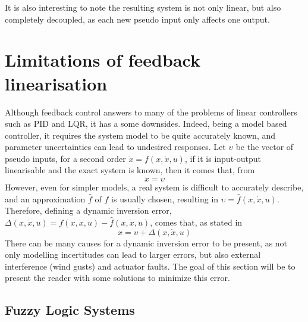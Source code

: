 It is also interesting to note the resulting system is not only linear, but also completely decoupled, as each new pseudo input only affects one output.

\section{Limitations of feedback linearisation}
\label{section:background/limitations}
Although feedback control answers to many of the problems of linear controllers such as PID and LQR, it has a some downsides. Indeed, being a model based controller, it requires the system model to be quite accurately known, and parameter uncertainties can lead to undesired responses. Let $\upsilon$ be the vector of pseudo inputs, for a second order $\ddot{x} = f(x,\dot{x},u)$, if it is input-output linearisable and the exact system is known, then it comes that, from \cite{YANG+LIN_Adaptive_Flight_Control}
\begin{equation}
\ddot{x}=\upsilon
\end{equation}
However, even for simpler models, a real system is difficult to accurately describe, and an approximation $\hat{f}$ of $f$ is usually chosen, resulting in $\upsilon=\hat{f}(x,\dot{x},u)$. Therefore, defining a dynamic inversion error, $\Delta(x,\dot{x},u)=f(x,\dot{x},u)-\hat{f}(x,\dot{x},u)$, comes that, as stated in \cite{YANG+LIN_Adaptive_Flight_Control}
\begin{equation}
\ddot{x}=\upsilon + \Delta(x,\dot{x},u)
\label{eq:system+error}
\end{equation}
There can be many causes for a dynamic inversion error to be present, as not only modelling incertitudes can lead to larger errors, but also external interference (wind gusts) and actuator faults. The goal of this section will be to present the reader with some solutions to minimize this error. 

\subsection{Fuzzy Logic Systems}
\label{section:background/fuzzy_logic}

